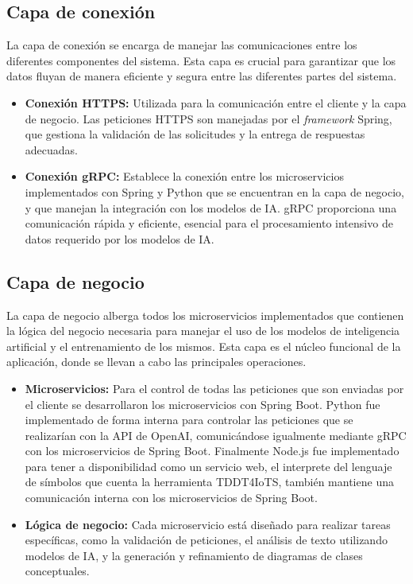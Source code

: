 \subsection{Capa de conexión}

La capa de conexión se encarga de manejar las comunicaciones entre los diferentes componentes del sistema. Esta capa es crucial para garantizar que los datos fluyan de manera eficiente y segura entre las diferentes partes del sistema.

\begin{itemize}
	\item \textbf{Conexión HTTPS:} Utilizada para la comunicación entre el cliente y la capa de negocio. Las peticiones HTTPS son manejadas por el \textit{framework} Spring, que gestiona la validación de las solicitudes y la entrega de respuestas adecuadas.
	\item \textbf{Conexión gRPC:} Establece la conexión entre los microservicios implementados con Spring y Python que se encuentran en la capa de negocio, y que manejan la integración con los modelos de IA. gRPC proporciona una comunicación rápida y eficiente, esencial para el procesamiento intensivo de datos requerido por los modelos de IA.
\end{itemize}

\subsection{Capa de negocio}

La capa de negocio alberga todos los microservicios implementados que contienen la lógica del negocio necesaria para manejar el uso de los modelos de inteligencia artificial y el entrenamiento de los mismos. Esta capa es el núcleo funcional de la aplicación, donde se llevan a cabo las principales operaciones.

\begin{itemize}
	\item \textbf{Microservicios:} Para el control de todas las peticiones que son enviadas por el cliente se desarrollaron los microservicios con Spring Boot. Python fue implementado de forma interna para controlar las peticiones que se realizarían con la API de OpenAI, comunicándose igualmente mediante gRPC con los microservicios de Spring Boot. Finalmente Node.js fue implementado para tener a disponibilidad como un servicio web, el interprete del lenguaje de símbolos que cuenta la herramienta TDDT4IoTS, también mantiene una comunicación interna con los microservicios de Spring Boot.
	\item \textbf{Lógica de negocio:} Cada microservicio está diseñado para realizar tareas específicas, como la validación de peticiones, el análisis de texto utilizando modelos de IA, y la generación y refinamiento de diagramas de clases conceptuales.
\end{itemize}

